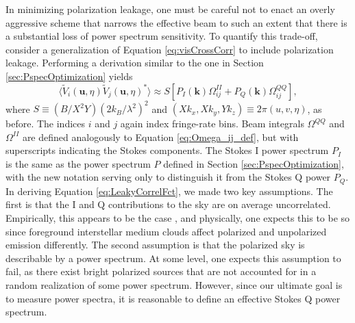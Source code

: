 \documentclass[twocolumn,apj,numberedappendix]{emulateapj}
\begin{document}

In minimizing polarization leakage, one must be careful not to enact an overly aggressive
scheme that narrows the effective beam to such an extent that there is a substantial loss of
power spectrum sensitivity. To quantify this trade-off, consider a generalization of Equation
\eqref{eq:visCrossCorr} to include polarization leakage. Performing a derivation similar to the one
in Section \ref{sec:PspecOptimization} yields
\begin{equation}
\label{eq:LeakyCorrelFct}
\langle \widetilde{V}_i(\mathbf{u},\eta) \widetilde{V}_j(\mathbf{u},\eta)^*\rangle \approx S \left[P_I (\mathbf{k}) \Omega_{ij}^{II} + P_Q (\mathbf{k}) \Omega_{ij}^{QQ}\right],
\end{equation}
where $S \equiv ( B / X^2 Y) ( 2 k_B / \lambda^2 )^2$ and $(X k_x, X k_y, Y k_z) \equiv 2 \pi (u , v, \eta)$, as before. The indices $i$ and $j$ again index fringe-rate
bins. Beam integrals $\Omega^{QQ}$ and $\Omega^{II}$ are defined analogously to Equation \eqref{eq:Omega_ij_def},
but with superscripts indicating the Stokes components. The Stokes I power spectrum $P_I$ is the same as the
power spectrum $P$ defined in Section \ref{sec:PspecOptimization}, with the new notation serving only to
distinguish it from the Stokes Q power $P_Q$. In deriving Equation \eqref{eq:LeakyCorrelFct}, we made two
key assumptions. The first is that the I and Q contributions to the sky are on average uncorrelated. Empirically, 
this appears to be the case \citep{wieringa_et_al1993,gaensler_et_al2001,bernardi_et_al2003}, and physically, one expects this to be so since foreground interstellar medium clouds affect polarized and unpolarized
emission differently.
The second assumption is that the polarized sky is describable by a power spectrum. At some level, one expects
this assumption to fail, as there exist bright polarized sources that are not accounted for in a random realization
of some power spectrum. However, since our ultimate goal is to measure power spectra, it is reasonable to
define an effective Stokes Q power spectrum.
\end{document}

